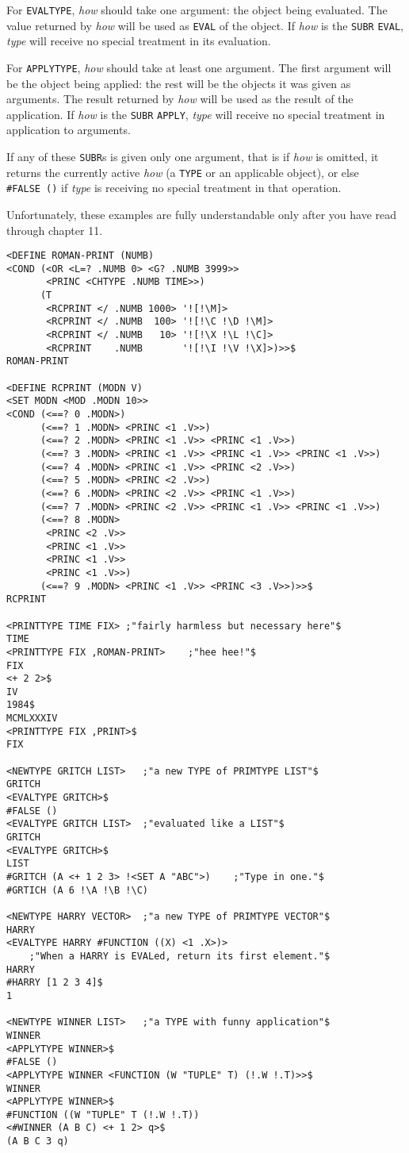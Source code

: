 \documentclass[a4paper]{scrbook}
\begin{document}
For \texttt{EVALTYPE}, \emph{how} should take one argument: the object being evaluated. The value returned by \emph{how}
will be used as \texttt{EVAL} of the object. If \emph{how} is the \texttt{SUBR} \texttt{EVAL},
\emph{type} will receive no special treatment in its evaluation.

For \texttt{APPLYTYPE}, \emph{how} should take at least one argument. The first argument will be the object being applied:
the rest will be the objects it was given as arguments. The result returned by \emph{how} will be used as the result of the
application. If \emph{how} is the \texttt{SUBR} \texttt{APPLY}, \emph{type} will receive no special
treatment in application to arguments.

If any of these \texttt{SUBR}s is given only one argument, that is if \emph{how} is omitted, it returns the currently
active \emph{how} (a \texttt{TYPE} or an applicable object), or else \texttt{\#FALSE\ ()} if \emph{type} is receiving no
special treatment in that operation.

Unfortunately, these examples are fully understandable only after you have read through chapter 11.

\begin{verbatim}
<DEFINE ROMAN-PRINT (NUMB)
<COND (<OR <L=? .NUMB 0> <G? .NUMB 3999>>
       <PRINC <CHTYPE .NUMB TIME>>)
      (T
       <RCPRINT </ .NUMB 1000> '![!\M]>
       <RCPRINT </ .NUMB  100> '![!\C !\D !\M]>
       <RCPRINT </ .NUMB   10> '![!\X !\L !\C]>
       <RCPRINT    .NUMB       '![!\I !\V !\X]>)>>$
ROMAN-PRINT

<DEFINE RCPRINT (MODN V)
<SET MODN <MOD .MODN 10>>
<COND (<==? 0 .MODN>)
      (<==? 1 .MODN> <PRINC <1 .V>>)
      (<==? 2 .MODN> <PRINC <1 .V>> <PRINC <1 .V>>)
      (<==? 3 .MODN> <PRINC <1 .V>> <PRINC <1 .V>> <PRINC <1 .V>>)
      (<==? 4 .MODN> <PRINC <1 .V>> <PRINC <2 .V>>)
      (<==? 5 .MODN> <PRINC <2 .V>>)
      (<==? 6 .MODN> <PRINC <2 .V>> <PRINC <1 .V>>)
      (<==? 7 .MODN> <PRINC <2 .V>> <PRINC <1 .V>> <PRINC <1 .V>>)
      (<==? 8 .MODN>
       <PRINC <2 .V>>
       <PRINC <1 .V>>
       <PRINC <1 .V>>
       <PRINC <1 .V>>)
      (<==? 9 .MODN> <PRINC <1 .V>> <PRINC <3 .V>>)>>$
RCPRINT

<PRINTTYPE TIME FIX> ;"fairly harmless but necessary here"$
TIME
<PRINTTYPE FIX ,ROMAN-PRINT>    ;"hee hee!"$
FIX
<+ 2 2>$
IV
1984$
MCMLXXXIV
<PRINTTYPE FIX ,PRINT>$
FIX

<NEWTYPE GRITCH LIST>   ;"a new TYPE of PRIMTYPE LIST"$
GRITCH
<EVALTYPE GRITCH>$
#FALSE ()
<EVALTYPE GRITCH LIST>  ;"evaluated like a LIST"$
GRITCH
<EVALTYPE GRITCH>$
LIST
#GRITCH (A <+ 1 2 3> !<SET A "ABC">)    ;"Type in one."$
#GRTICH (A 6 !\A !\B !\C)

<NEWTYPE HARRY VECTOR>  ;"a new TYPE of PRIMTYPE VECTOR"$
HARRY
<EVALTYPE HARRY #FUNCTION ((X) <1 .X>)>
    ;"When a HARRY is EVALed, return its first element."$
HARRY
#HARRY [1 2 3 4]$
1

<NEWTYPE WINNER LIST>   ;"a TYPE with funny application"$
WINNER
<APPLYTYPE WINNER>$
#FALSE ()
<APPLYTYPE WINNER <FUNCTION (W "TUPLE" T) (!.W !.T)>>$
WINNER
<APPLYTYPE WINNER>$
#FUNCTION ((W "TUPLE" T (!.W !.T))
<#WINNER (A B C) <+ 1 2> q>$
(A B C 3 q)
\end{verbatim}
\end{document}
